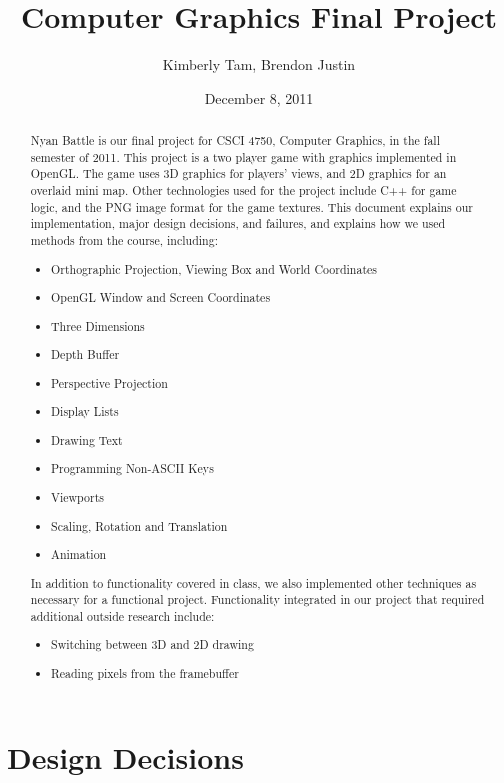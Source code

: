 \documentclass[12pt]{article}
\begin{document}
\title{Computer Graphics Final Project} 
\author{Kimberly Tam, Brendon Justin} 
\date{December 8, 2011}
\maketitle

\begin{abstract}
Nyan Battle is our final project for CSCI 4750, Computer Graphics, in the fall semester of 2011. 
This project is a two player game with graphics implemented in OpenGL. The game uses 3D graphics for players' views, and 2D graphics for an overlaid mini map.  Other technologies used for the project include C++ for game logic, and the PNG image format for the game textures. This document explains our implementation, major design decisions, and failures, and explains how we used methods from the course, including:

\begin{itemize}
\item Orthographic Projection, Viewing Box and World Coordinates
\item OpenGL Window and Screen Coordinates
\item Three Dimensions
\item Depth Buffer
\item Perspective Projection
\item Display Lists
\item Drawing Text
\item Programming Non-ASCII Keys
\item Viewports
\item Scaling, Rotation and Translation
\item Animation
\end{itemize} 

In addition to functionality covered in class, we also implemented other techniques as necessary for a functional project. Functionality integrated in our project that required additional outside research include:

\begin{itemize}
\item Switching between 3D and 2D drawing
\item Reading pixels from the framebuffer
\end{itemize}
\end{abstract} 

\newpage
\tableofcontents
\newpage

\section {Design Decisions}
\end{document}
